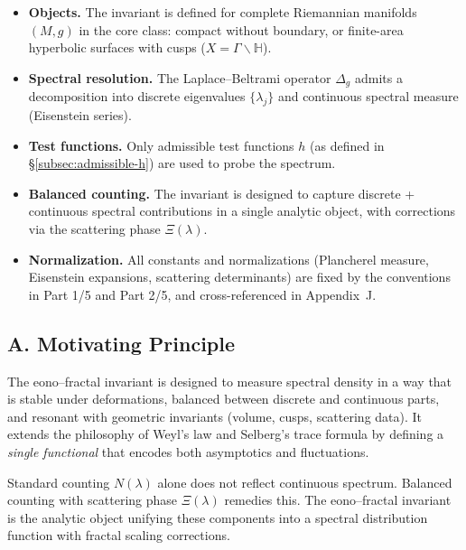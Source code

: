 \begin{tcolorbox}[colback=gray!5,colframe=gray!35,title=Scope \& Assumptions (MEA-Core-SS • enforced)]
\begin{itemize}
  \item \textbf{Objects.} The invariant is defined for complete Riemannian manifolds $(M,g)$ in the core class:
        compact without boundary, or finite-area hyperbolic surfaces with cusps ($X=\Gamma\backslash\mathbb{H}$).
  \item \textbf{Spectral resolution.} The Laplace–Beltrami operator $\Delta_g$ admits a decomposition into
        discrete eigenvalues $\{\lambda_j\}$ and continuous spectral measure (Eisenstein series).
  \item \textbf{Test functions.} Only admissible test functions $h$ (as defined in \S\ref{subsec:admissible-h})
        are used to probe the spectrum. 
  \item \textbf{Balanced counting.} The invariant is designed to capture discrete + continuous spectral contributions
        in a single analytic object, with corrections via the scattering phase $\Xi(\lambda)$.
  \item \textbf{Normalization.} All constants and normalizations (Plancherel measure, Eisenstein expansions, scattering determinants)
        are fixed by the conventions in Part 1/5 and Part 2/5, and cross-referenced in Appendix~J.
\end{itemize}
\end{tcolorbox}

\subsection*{A. Motivating Principle}
\label{subsec:invariant-motivation}

The eono–fractal invariant is designed to measure spectral density in a way that is
stable under deformations, balanced between discrete and continuous parts,
and resonant with geometric invariants (volume, cusps, scattering data).
It extends the philosophy of Weyl's law and Selberg’s trace formula by defining
a \emph{single functional} that encodes both asymptotics and fluctuations.

\begin{remark}
Standard counting $N(\lambda)$ alone does not reflect continuous spectrum.
Balanced counting with scattering phase $\Xi(\lambda)$ remedies this.
The eono–fractal invariant is the analytic object unifying these components
into a spectral distribution function with fractal scaling corrections.
\end{remark}

